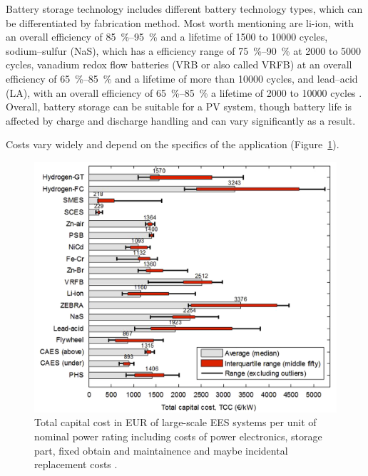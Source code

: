 Battery storage technology includes different battery technology types, which can be differentiated by fabrication method. Most worth mentioning are \ac{li-ion}, with an overall efficiency of \SIrange{85}{95}{\percent} and a lifetime of \num{1500} to \num{10000} cycles, sodium–sulfur (NaS), which has a efficiency range of \SIrange{75}{90}{\percent} at \num{2000} to \num{5000} cycles, vanadium redox flow batteries (VRB or also called VRFB) at an overall efficiency of \SIrange{65}{85}{\percent} and a lifetime of more than \num{10000} cycles, and lead–acid (LA), with an overall efficiency of \SIrange{65}{85}{\percent} a lifetime of \num{2000} to \num{10000} cycles \cite{IEA2014c,Zakeri2015}. Overall, battery storage can be suitable for a \ac{PV} system, though battery life is affected by charge and discharge handling and can vary significantly as a result.



Costs vary widely and depend on the specifics of the application (Figure~\ref{TCC_EES}).


\begin{figure}[htbp]  
\centering
\includegraphics[width=0.65\linewidth]{FIG/TCC_EES}
\caption[Total capital cost in EUR of large-scale EES systems per unit of nominal power rating including costs of power electronics, storage part, fixed obtain and maintainence and maybe incidental replacement costs.]{Total capital cost in EUR of large-scale EES systems per unit of nominal power rating including costs of power electronics, storage part, fixed obtain and maintainence and maybe incidental replacement costs \cite{Zakeri2015}.}\label{TCC_EES}
\end{figure}
\pagebreak
